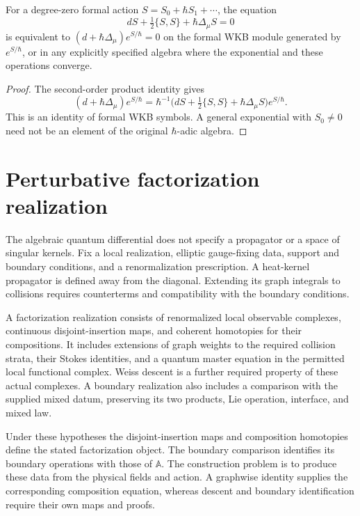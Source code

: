 \begin{theorem}
For a degree-zero formal action $S=S_0+\hbar S_1+\cdots$, the equation
\[
 dS+\tfrac12\{S,S\}+\hbar\Delta_\mu S=0
\]
is equivalent to $(d+\hbar\Delta_\mu)e^{S/\hbar}=0$ on the formal WKB
module generated by $e^{S/\hbar}$, or in any explicitly specified algebra
where the exponential and these operations converge.
\end{theorem}
\begin{proof}
The second-order product identity gives
\[
 (d+\hbar\Delta_\mu)e^{S/\hbar}
 =\hbar^{-1}\bigl(dS+\tfrac12\{S,S\}+\hbar\Delta_\mu S\bigr)e^{S/\hbar}.
\]
This is an identity of formal WKB symbols. A general exponential with
$S_0\ne0$ need not be an element of the original $\hbar$-adic algebra.
\end{proof}

\section{Perturbative factorization realization}
The algebraic quantum differential does not specify a propagator or a space of singular kernels. Fix a local realization, elliptic gauge-fixing data, support and boundary conditions, and a renormalization prescription. A heat-kernel propagator is defined away from the diagonal. Extending its graph integrals to collisions requires counterterms and compatibility with the boundary conditions.

\begin{definition}
A factorization realization consists of renormalized local observable complexes, continuous disjoint-insertion maps, and coherent homotopies for their compositions. It includes extensions of graph weights to the required collision strata, their Stokes identities, and a quantum master equation in the permitted local functional complex. Weiss descent is a further required property of these actual complexes. A boundary realization also includes a comparison with the supplied mixed datum, preserving its two products, Lie operation, interface, and mixed law.
\end{definition}

Under these hypotheses the disjoint-insertion maps and composition homotopies define the stated factorization object. The boundary comparison identifies its boundary operations with those of $\mathbb A$. The construction problem is to produce these data from the physical fields and action. A graphwise identity supplies the corresponding composition equation, whereas descent and boundary identification require their own maps and proofs.

